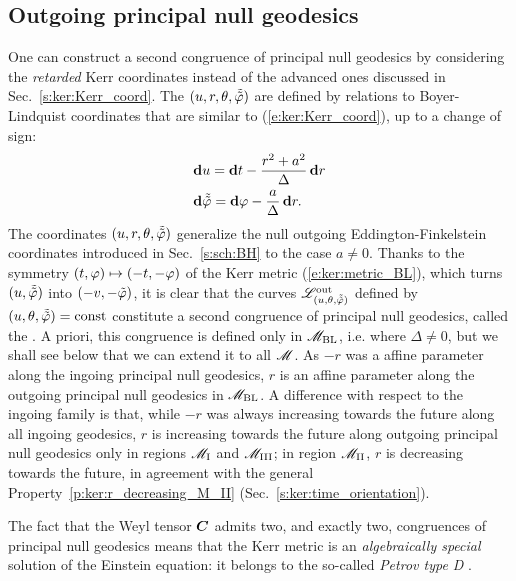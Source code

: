 \subsection{Outgoing principal null geodesics} \label{s:ker:out_princ_null_geod}

One can construct a second congruence of principal null geodesics by considering
the \emph{retarded} Kerr coordinates instead of the advanced ones
discussed in Sec.~\ref{s:ker:Kerr_coord}. The
$(u,r,\theta,\tilde{{\tilde\varphi}})$ are defined by relations to Boyer-Lindquist
coordinates that are similar to
(\ref{e:ker:Kerr_coord}), up to a change of sign:
\begin{subequations}
\label{e:ker:out_Kerr_coord}
\begin{align}
& \mathbf{d} u = \mathbf{d} t - \frac{r^2+a^2}{\Delta} \, \mathbf{d} r \\
& \mathbf{d} \tilde{{\tilde\varphi}} = \mathbf{d} \varphi - \frac{a}{\Delta}\, \mathbf{d} r .
\end{align}
\end{subequations}
The coordinates $(u,r,\theta,\tilde{{\tilde\varphi}})$ generalize the null
outgoing Eddington-Finkelstein
coordinates introduced in Sec.~\ref{s:sch:BH} to the case $a\not=0$.
Thanks to the symmetry $(t,\varphi)\mapsto(-t,-\varphi)$ of the Kerr metric (\ref{e:ker:metric_BL}), which turns $(u,\tilde{{\tilde\varphi}})$ into $(-v,-{\tilde\varphi})$, it is clear that the
curves $\mathscr{L}^{\rm out}_{(u,\theta,\tilde{{\tilde\varphi}})}$
defined by $(u,\theta,\tilde{{\tilde\varphi}})=\mathrm{const}$ constitute a second
congruence of principal null geodesics, called the .
A priori, this congruence is defined only in $\mathscr{M}_{\rm BL}$, i.e. where $\Delta\neq 0$,
but we shall see below that we can extend it to all $\mathscr{M}$.
As $-r$ was a affine parameter along
the ingoing principal null geodesics, $r$ is an affine parameter along
the outgoing principal null geodesics in $\mathscr{M}_{\rm BL}$.
A difference with respect to the ingoing family is that, while $-r$ was always
increasing towards the future along all ingoing geodesics,
 $r$ is increasing towards the future
along outgoing principal null geodesics only in regions
$\mathscr{M}_{\rm I}$ and $\mathscr{M}_{\rm III}$; in region $\mathscr{M}_{\rm II}$,
$r$ is decreasing towards the future, in agreement with the general
Property~\ref{p:ker:r_decreasing_M_II} (Sec.~\ref{s:ker:time_orientation}).

The fact that the Weyl tensor $\bm{C}$
admits two, and exactly two, congruences of principal null geodesics
means that the Kerr metric is an \emph{algebraically special} solution of
the Einstein equation: it belongs to the so-called \emph{Petrov type D}
\cite{ONeil95}.

